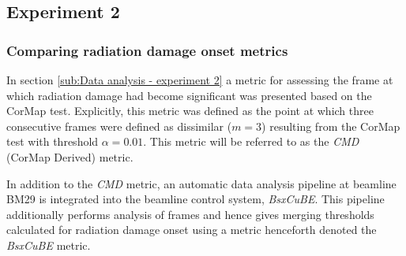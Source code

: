 \subsection{Experiment 2}
\label{sub:Experiment 2 - Results}

\subsubsection{Comparing radiation damage onset metrics}
\label{subs:Comparing radiation damage onset metrics}
In section \ref{sub:Data analysis - experiment 2} a metric for assessing the frame at which radiation damage had become significant was presented based on the CorMap test.
Explicitly, this metric was defined as the point at which three consecutive frames were defined as dissimilar ($m = 3$) resulting from the CorMap test with threshold $\alpha = 0.01$.
This metric will be referred to as the \textit{CMD} (CorMap Derived) metric.

In addition to the \textit{CMD} metric, an automatic data analysis pipeline at beamline BM29 \cite{brennich2016online} is integrated into the beamline control system, \textit{BsxCuBE}.
This pipeline additionally performs analysis of frames and hence gives merging thresholds calculated for radiation damage onset using a metric henceforth denoted the \textit{BsxCuBE} metric.

